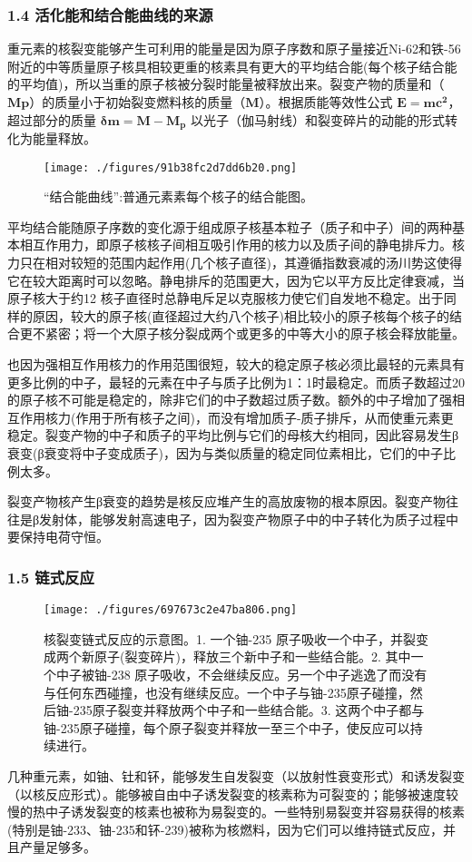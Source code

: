 \subsubsection{1.4 活化能和结合能曲线的来源}
重元素的核裂变能够产生可利用的能量是因为原子序数和原子量接近Ni-62和铁-56附近的中等质量原子核具相较更重的核素具有更大的平均结合能(每个核子结合能的平均值)，所以当重的原子核被分裂时能量被释放出来。裂变产物的质量和（$\mathbf{Mp}$）的质量小于初始裂变燃料核的质量（$\mathbf{M}$）。根据质能等效性公式 $\mathbf{E=mc^2}$，超过部分的质量 $\mathbf{\delta m = M - M_p}$ 以光子（伽马射线）和裂变碎片的动能的形式转化为能量释放。
\begin{figure}[ht]
\centering
\texttt{[image: ./figures/91b38fc2d7dd6b20.png]}
\caption{“结合能曲线”:普通元素素每个核子的结合能图。} \label{fig_HLB_5}
\end{figure}
平均结合能随原子序数的变化源于组成原子核基本粒子（质子和中子）间的两种基本相互作用力，即原子核核子间相互吸引作用的核力以及质子间的静电排斥力。核力只在相对较短的范围内起作用(几个核子直径)，其遵循指数衰减的汤川势这使得它在较大距离时可以忽略。静电排斥的范围更大，因为它以平方反比定律衰减，当原子核大于约12 核子直径时总静电斥足以克服核力使它们自发地不稳定。出于同样的原因，较大的原子核(直径超过大约八个核子)相比较小的原子核每个核子的结合更不紧密；将一个大原子核分裂成两个或更多的中等大小的原子核会释放能量。

也因为强相互作用核力的作用范围很短，较大的稳定原子核必须比最轻的元素具有更多比例的中子，最轻的元素在中子与质子比例为1：1时最稳定。而质子数超过20的原子核不可能是稳定的，除非它们的中子数超过质子数。额外的中子增加了强相互作用核力(作用于所有核子之间)，而没有增加质子-质子排斥，从而使重元素更稳定。裂变产物的中子和质子的平均比例与它们的母核大约相同，因此容易发生β衰变(β衰变将中子变成质子)，因为与类似质量的稳定同位素相比，它们的中子比例太多。

裂变产物核产生β衰变的趋势是核反应堆产生的高放废物的根本原因。裂变产物往往是β发射体，能够发射高速电子，因为裂变产物原子中的中子转化为质子过程中要保持电荷守恒。

\subsubsection{1.5 链式反应}
\begin{figure}[ht]
\centering
\texttt{[image: ./figures/697673c2e47ba806.png]}
\caption{核裂变链式反应的示意图。1. 一个铀-235 原子吸收一个中子，并裂变成两个新原子(裂变碎片)，释放三个新中子和一些结合能。2. 其中一个中子被铀-238 原子吸收，不会继续反应。另一个中子逃逸了而没有与任何东西碰撞，也没有继续反应。一个中子与铀-235原子碰撞，然后铀-235原子裂变并释放两个中子和一些结合能。3. 这两个中子都与铀-235原子碰撞，每个原子裂变并释放一至三个中子，使反应可以持续进行。} \label{fig_HLB_6}
\end{figure}
几种重元素，如铀、钍和钚，能够发生自发裂变（以放射性衰变形式）和诱发裂变（以核反应形式）。能够被自由中子诱发裂变的核素称为可裂变的；能够被速度较慢的热中子诱发裂变的核素也被称为易裂变的。一些特别易裂变并容易获得的核素(特别是铀-233、铀-235和钚-239)被称为核燃料，因为它们可以维持链式反应，并且产量足够多。

